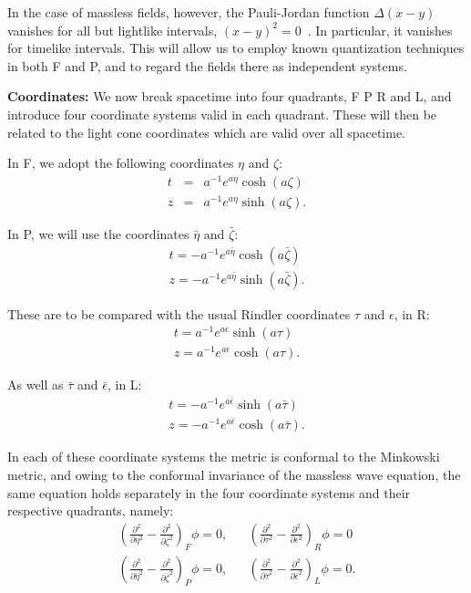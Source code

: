 \documentclass[aps,prl,twocolumn,showpacs]{revtex4}
\begin{document}
In the case of massless fields, however, the Pauli-Jordan function $\Delta (x - y)$ vanishes for all but lightlike intervals, $(x - y)^2 = 0$~\cite{heitler1}.  In particular, it vanishes for timelike intervals.  This will allow us to employ known quantization techniques in both F and P, and to regard the fields there as independent systems.

\textbf{Coordinates:} We now break spacetime into four quadrants, F P R and L, and introduce four coordinate systems valid in each quadrant.  These will then be related to the light cone coordinates which are valid over all spacetime.

In F, we adopt the following coordinates $\eta$ and $\zeta$:
\begin{eqnarray*}
 t  &=&  a^{-1} e^{a \eta} \cosh(a \zeta) \\
 z  &=&  a^{-1} e^{a \eta} \sinh(a \zeta) .
\end{eqnarray*}

In P, we will use the coordinates $\bar{\eta}$ and $\bar{\zeta}$:
\begin{eqnarray*}
 t = - a^{-1} e^{a \bar{\eta}} \cosh(a \bar{\zeta}) \\
 z = - a^{-1} e^{a \bar{\eta}} \sinh( a \bar{\zeta}).
\end{eqnarray*}

These are to be compared with the usual Rindler coordinates $\tau$ and $\epsilon$, in R:
\begin{eqnarray*}
t  =  a^{-1} e^{a \epsilon} \sinh(a \tau) \\
z  =  a^{-1} e^{a \epsilon} \cosh(a \tau).
\end{eqnarray*}

As well as $\bar{\tau}$ and $\bar{\epsilon}$, in L:
\begin{eqnarray*}
t  =  -a^{-1} e^{a \bar{\epsilon}} \sinh(a \bar{\tau}) \\
z  =  -a^{-1} e^{a \bar{\epsilon}} \cosh(a \bar{\tau}).
\end{eqnarray*}


In each of these coordinate systems the metric is conformal to the Minkowski metric, and owing to the conformal invariance of the massless wave equation, the same equation holds separately in the four coordinate systems and their respective quadrants, namely:
\begin{eqnarray*}
\left( \frac{\partial^2}{\partial \eta^2} - \frac{\partial^2}{\partial \zeta^2}\right)_{F} \phi = 0, && \left( \frac{\partial^2}{\partial \tau^2} - \frac{\partial^2}{\partial \epsilon^2}\right)_{R} \phi = 0 \\
\left( \frac{\partial^2}{\partial \bar{\eta}^2} - \frac{\partial^2}{\partial \bar{\zeta}^2}\right)_{P} \phi = 0, && \left( \frac{\partial^2}{\partial \bar{\tau}^2} - \frac{\partial^2}{\partial \bar{\epsilon}^2}\right)_{L} \phi = 0.
\end{eqnarray*}
\end{document}
